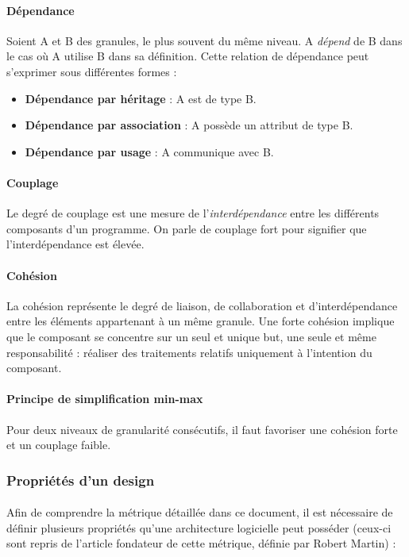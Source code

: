 \documentclass{scrartcl}
\begin{document}
    \paragraph{Dépendance}Soient A et B des granules, le plus souvent du même niveau. A \emph{dépend} de B dans le cas où A utilise B dans sa définition. Cette relation de dépendance peut s'exprimer sous différentes formes :
    \begin{itemize}
        \item \textbf{Dépendance par héritage} : A est de type B.
        \item \textbf{Dépendance par association} : A possède un attribut de type B.
        \item \textbf{Dépendance par usage} : A communique avec B. 
    \end{itemize}

    \paragraph{Couplage}Le degré de couplage est une mesure de l'\emph{interdépendance} entre les différents composants d'un programme. On parle de couplage fort pour signifier que l'interdépendance est élevée.

    \paragraph{Cohésion}La cohésion représente le degré de liaison, de collaboration et d'interdépendance entre les éléments appartenant à un même granule. Une forte cohésion implique que le composant se concentre sur un seul et unique but, une seule et même responsabilité : réaliser des traitements relatifs uniquement à l’intention du composant.
    
    \paragraph{Principe de simplification min-max}Pour deux niveaux de granularité consécutifs, il faut favoriser une cohésion forte et un couplage faible.

\subsubsection{Propriétés d'un design}

    \paragraph{}Afin de comprendre la métrique détaillée dans ce document, il est nécessaire de définir plusieurs propriétés qu'une architecture logicielle peut posséder (ceux-ci sont repris de l'article fondateur de cette métrique, définie par Robert Martin\cite{Martin:1994}) :
\end{document}

